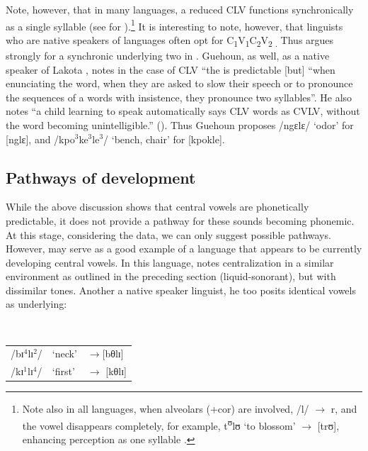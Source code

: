 \documentclass[output=paper,newtxmath,modfonts,nonflat,draft]{langsci/langscibook}
\begin{document}
Note, however, that in many languages, a reduced CLV functions synchronically as a single syllable (see \citealt{Gratrix1975} for ){}.\footnote{Note also in all  languages, when alveolars (+cor) are involved, /l/ $\rightarrow$ r, and the vowel disappears completely, for example,  t\textsuperscript{ʊ}lʊ ‘to blossom’ $\rightarrow$ [trʊ], enhancing perception as one syllable \citep{Marchese1979/1983}.} It is interesting to note, however, that linguists who are native speakers of  languages often opt for C\textsubscript{1}V\textsubscript{1}C\textsubscript{2}V\textsubscript{2 .}  Thus \citet{Kipre2015} argues strongly for a synchronic underlying two  in  . Guehoun, as well, as a native speaker of Lakota , notes in the case of CLV “the  is predictable [but] “when enunciating the word, when they are asked to slow their speech or to pronounce the sequences of a words with insistence, they pronounce two syllables”. He also notes “a child learning to speak automatically says CLV words as CVLV, without the word becoming unintelligible.” (\citeyear[55–56]{Guehoun1993}). Thus Guehoun proposes /ngɛlɛ/ ‘odor’ for [nglɛ], and /kpo$^3$ke$^3$le$^3$/ ‘bench, chair’ for [kpokle].  

\subsection{Pathways of development}\label{sec:zogbo:4.2} 

While the above discussion shows that central vowels are phonetically predictable, it does not provide a pathway for these sounds becoming phonemic.  At this stage, considering the data, we can only suggest possible pathways.  However,  may serve as a good example of a language that appears to be currently developing central vowels.  In this language, \citet[191]{Goprou2014} notes centralization in a similar environment as outlined in the preceding section (liquid-sonorant), but with dissimilar tones. Another a native speaker linguist, he too posits identical vowels as underlying:

\ea {}\\
\begin{tabular}{lll}
/bɪ$^4$lɪ$^2$/ & ‘neck’ & $\rightarrow$[bθlɪ]\\
/kɪ$^1$lɪ$^4$/ & ‘first’ & $\rightarrow$ [kθlɪ]\\
\end{tabular}
\z
\end{document}
